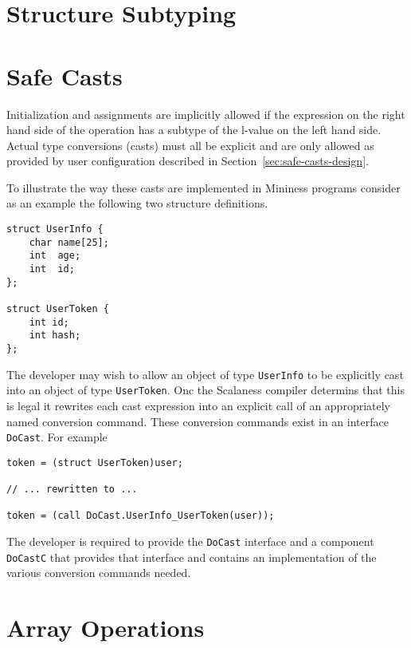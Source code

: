 \section{Structure Subtyping}
\label{sec:structure-subtyping-implementation}

\section{Safe Casts}
\label{sec:safe-casts-implementation}

Initialization and assignments are implicitly allowed if the expression on the right hand side
of the operation has a subtype of the l-value on the left hand side. Actual type conversions
(casts) must all be explicit and are only allowed as provided by user configuration described in
Section~\ref{sec:safe-casts-design}.

To illustrate the way these casts are implemented in Mininess programs consider as an example
the following two structure definitions.

\singlespace
\begin{Verbatim}
struct UserInfo {
    char name[25];
    int  age;
    int  id;
};

struct UserToken {
    int id;
    int hash;
};
\end{Verbatim}
\primaryspacing

The developer may wish to allow an object of type \texttt{UserInfo} to be explicitly cast into
an object of type \texttt{UserToken}. Onc the Scalaness compiler determins that this is legal it
rewrites each cast expression into an explicit call of an appropriately named conversion
command. These conversion commands exist in an interface \texttt{DoCast}. For example

\singlespace
\begin{Verbatim}
token = (struct UserToken)user;

// ... rewritten to ...

token = (call DoCast.UserInfo_UserToken(user));
\end{Verbatim}
\primaryspacing

The developer is required to provide the \texttt{DoCast} interface and a component
\texttt{DoCastC} that provides that interface and contains an implementation of the various
conversion commands needed.


\section{Array Operations}
\label{sec:array-operations-implementation}

